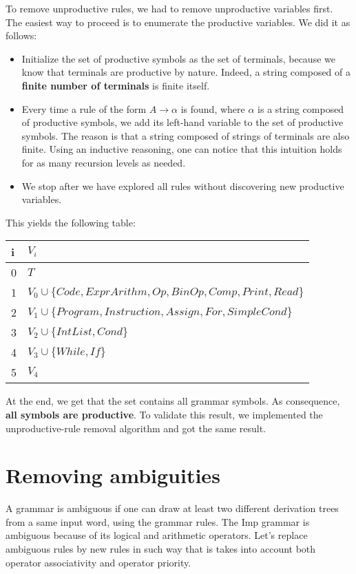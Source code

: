 To remove unproductive rules, we had to remove unproductive variables first. The easiest way to proceed is to enumerate the productive variables.
We did it as follows:
\begin{itemize}
  \item Initialize the set of productive symbols as the set of terminals, because we know that terminals are productive by nature. Indeed, 
  a string composed of a \textbf{finite number of terminals} is finite itself.
  \item Every time a rule of the form $A \rightarrow \alpha$ is found, where $\alpha$ is a string composed of productive symbols, we add its left-hand 
  variable to the set of productive symbols. The reason is that a string composed of strings of terminals are also finite. Using an inductive reasoning, 
  one can notice that this intuition holds for as many recursion levels as needed.
  \item We stop after we have explored all rules without discovering new productive variables.
\end{itemize}
This yields the following table:

\begin{tabular}{|l p{35em}|} \hline
   i & $V_i$ \\ \hline
  0 & $T$ \\ \hline
  1 & $V_0 \cup \{Code, ExprArithm, Op, BinOp, Comp, Print, Read\}$ \\ \hline
  2 & $V_1 \cup \{Program, Instruction, Assign, For, SimpleCond\}$ \\ \hline
  3 & $V_2 \cup \{IntList, Cond\}$ \\ \hline
  4 & $V_3 \cup \{While, If\}$ \\ \hline
  5 & $V_4$ \\ \hline
\end{tabular}

At the end, we get that the set contains all grammar symbols. As consequence, \textbf{all symbols are productive}. To validate this result, we implemented
the unproductive-rule removal algorithm and got the same result.

\section{Removing ambiguities}

A grammar is ambiguous if one can draw at least two different derivation trees from a same input word, using the grammar rules.
The Imp grammar is ambiguous because of its logical and arithmetic operators. Let's replace ambiguous rules by new rules in such way
that is takes into account both operator associativity and operator priority.

